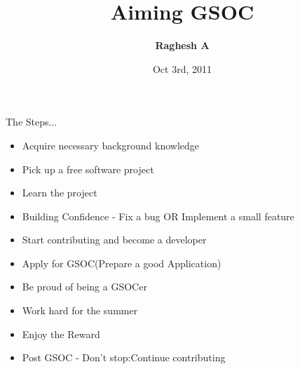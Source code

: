 \documentclass{beamer}
\title{Aiming GSOC}
\author{\textbf{Raghesh A}}
\date{Oct 3rd, 2011}
\begin{document}
\begin{frame}
\titlepage
\end{frame}

\begin{frame}{The Steps...}
\begin{itemize}
\item Acquire necessary background knowledge
\item Pick up a free software project
\item Learn the project
\item Building Confidence - Fix a bug OR Implement a small feature
\item Start contributing and become a developer
\item Apply for GSOC(Prepare a good Application)
\item Be proud of being a GSOCer
\item Work hard for the summer
\item Enjoy the Reward
\item Post GSOC - Don't stop:Continue contributing
\end{itemize}
\end{frame}
\end{document}
